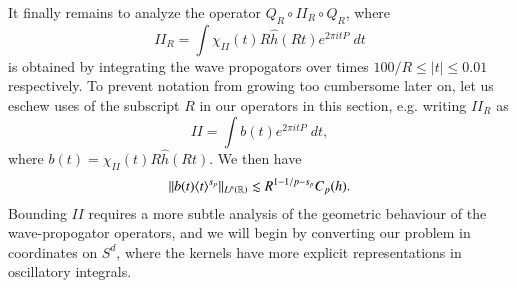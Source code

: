 It finally remains to analyze the operator $Q_R \circ II_R \circ Q_R$, where
%
\[ II_R = \int \chi_{II}(t) R \widehat{h}(Rt) e^{2 \pi i t P}\; dt \] %
%
is obtained by integrating the wave propogators over times $100/R \leq |t| \leq 0.01$ respectively. To prevent notation from growing too cumbersome later on, let us eschew uses of the subscript $R$ in our operators in this section, e.g. writing $II_R$ as
%
\[ II = \int b(t) e^{2 \pi i t P}\; dt, \]
%
where $b(t) = \chi_{II}(t) R \widehat{h}(Rt)$. We then have
%
\[ \| b(t) \langle t \rangle^{s_p} \|_{L^p(\operatorname{\mathbb{R}})} \lesssim R^{1 - 1/p - s_p} C_p(h). \]
%
Bounding $II$ requires a more subtle analysis of the geometric behaviour of the wave-propogator operators, and we will begin by converting our problem in coordinates on $S^d$, where the kernels have more explicit representations in oscillatory integrals.
